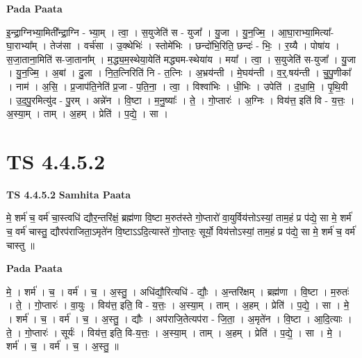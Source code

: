 \documentclass[17pt]{extarticle}
\begin{document}
\textbf{Pada Paata} \newline

इ॒न्द्रा॒ग्निभ्या॒मिती᳚न्द्रा॒ग्नि - भ्या॒म् । त्वा॒ । स॒युजेति॑ स - युजा᳚ । यु॒जा । यु॒न॒ज्मि॒ । आ॒घा॒राभ्या॒मित्या᳚-घा॒राभ्या᳚म् । तेज॑सा । वर्च॑सा । उ॒क्थेभिः॑ । स्तोमे॑भिः । छन्दो॑भि॒रिति॒ छन्दः॑ - भिः॒ । र॒य्यै । पोषा॑य । स॒जा॒ताना॒मिति॑ स-जा॒ताना᳚म् । म॒द्ध्य॒म॒स्थेया॒येति॑ मद्ध्यम-स्थेया॑य । मया᳚ । त्वा॒ । स॒युजेति॑ स-युजा᳚ । यु॒जा । यु॒न॒ज्मि॒ । अ॒बां । दु॒ला । नि॒त॒त्निरिति॑ नि - त॒त्निः । अ॒भ्रय॑न्ती । मे॒घय॑न्ती । व॒र्॒.षय॑न्ती । चु॒पु॒णीका᳚ । नाम॑ । अ॒सि॒ । प्र॒जाप॑ति॒नेति॑ प्र॒जा - प॒ति॒ना॒ । त्वा॒ । विश्वा॑भिः । धी॒भिः । उपेति॑ । द॒धा॒मि॒ । पृ॒थि॒वी । उ॒द॒पु॒रमित्यु॑द - पु॒रम् । अन्ने॑न । वि॒ष्टा । म॒नु॒ष्याः᳚ । ते॒ । गो॒प्तारः॑ । अ॒ग्निः । विय॑त्त॒ इति॑ वि - य॒त्तः॒ । अ॒स्या॒म् । ताम् । अ॒हम् । प्रेति॑ । प॒द्ये॒ । सा ।  \newline





\section{ TS 4.4.5.2 }

\textbf{TS 4.4.5.2 } \newline
\textbf{Samhita Paata} \newline

मे॒ शर्म॑ च॒ वर्म॑ चा॒स्त्वधि॑ द्यौर॒न्तरि॑क्षं॒ ब्रह्म॑णा वि॒ष्टा म॒रुत॑स्ते गो॒प्तारो॑ वा॒युर्विय॑त्तोऽस्यां॒ ताम॒हं प्र प॑द्ये॒ सा मे॒ शर्म॑ च॒ वर्म॑ चास्तु॒ द्यौरप॑राजिता॒ऽमृते॑न वि॒ष्टाऽऽदि॒त्यास्ते॑ गो॒प्तारः॒ सूर्यो॒ विय॑त्तोऽस्यां॒ ताम॒हं प्र प॑द्ये॒ सा मे॒ शर्म॑ च॒ वर्म॑ चास्तु ॥ \newline

\textbf{Pada Paata} \newline

मे॒ । शर्म॑ । च॒ । वर्म॑ । च॒ । अ॒स्तु॒ । अधि॑द्यौ॒रित्यधि॑ - द्यौः॒ । अ॒न्तरि॑क्षम् । ब्रह्म॑णा । वि॒ष्टा । म॒रुतः॑ । ते॒ । गो॒प्तारः॑ । वा॒युः । विय॑त्त॒ इति॒ वि - य॒त्तः॒ । अ॒स्या॒म् । ताम् । अ॒हम् । प्रेति॑ । प॒द्ये॒ । सा । मे॒ । शर्म॑ । च॒ । वर्म॑ । च॒ । अ॒स्तु॒ । द्यौः । अप॑राजि॒तेत्यप॑रा - जि॒ता॒ । अ॒मृते॑न । वि॒ष्टा । आ॒दि॒त्याः । ते॒ । गो॒प्तारः॑ । सूर्यः॑ । विय॑त्त॒ इति॒ वि-य॒त्तः॒ । अ॒स्या॒म् । ताम् । अ॒हम् । प्रेति॑ । प॒द्ये॒ । सा । मे॒ । शर्म॑ । च॒ । वर्म॑ । च॒ । अ॒स्तु॒ ॥  \newline
\end{document}
